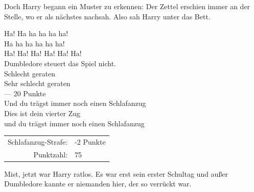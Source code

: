 
Doch Harry begann ein Muster zu erkennen: Der Zettel erschien immer an der Stelle, wo er als nächstes nachsah. Also sah Harry unter das Bett.
\begin{writtenNote}
Ha! Ha ha ha ha ha!\\
Ha ha ha ha ha ha!\\
Ha! Ha! Ha! Ha! Ha! Ha!\\
Dumbledore steuert das Spiel nicht.\\
Schlecht geraten\\
Sehr schlecht geraten\\
— 20 Punkte\\
Und du trägst immer noch einen Schlafanzug\\
Dies ist dein vierter Zug\\
und du trägst immer noch einen Schlafanzug

\begin{tabular}{rl}
Schlafanzug-Strafe: & -2 Punkte\\
Punktzahl: & 75
\end{tabular}
\end{writtenNote}

Mist, jetzt war Harry ratlos. Es war erst sein erster Schultag und außer Dumbledore kannte er niemanden hier, der so verrückt war.

